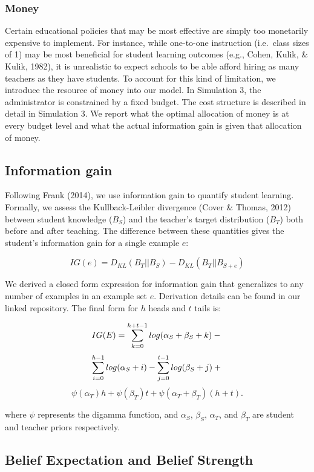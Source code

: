 \documentclass[10pt, letterpaper]{apa6}
\begin{document}
\subsubsection{Money}\label{money}

Certain educational policies that may be most effective are simply too
monetarily expensive to implement. For instance, while one-to-one
instruction (i.e.~class sizes of 1) may be most beneficial for student
learning outcomes (e.g., Cohen, Kulik, \& Kulik, 1982), it is
unrealistic to expect schools to be able afford hiring as many teachers
as they have students. To account for this kind of limitation, we
introduce the resource of money into our model. In Simulation 3, the
administrator is constrained by a fixed budget. The cost structure is
described in detail in Simulation 3. We report what the optimal
allocation of money is at every budget level and what the actual
information gain is given that allocation of money.

\subsection{Information gain}\label{information-gain}

Following Frank (2014), we use information gain to quantify student
learning. Formally, we assess the Kullback-Leibler divergence (Cover \&
Thomas, 2012) between student knowledge (\(B_S\)) and the teacher's
target distribution (\(B_T\)) both before and after teaching. The
difference between these quantities gives the student's information gain
for a single example \(e\):

\[IG(e) = D_{KL}(B_T ||B_S) - D_{KL}(B_T || B_{S+e})\]

We derived a closed form expression for information gain that
generalizes to any number of examples in an example set \(e\).
Derivation details can be found in our linked repository. The final form
for \(h\) heads and \(t\) tails is:

\[IG(E) = \sum_{k=0}^{h+t-1} {log(\alpha_S + \beta_S + k)} - \\\]
\[\sum_{i=0}^{h-1} {log (\alpha_S + i)} - \sum_{j=0}^{t-1} {log(\beta_S +j)} + \\\]
\[\psi(\alpha_T)h + \psi(\beta_T)t +  \psi(\alpha_T + \beta_T)(h+t).\]

\noindent where \(\psi\) represents the digamma function, and
\(\alpha_S\), \(\beta_S\), \(\alpha_T\), and \(\beta_T\) are student and
teacher priors respectively.

\subsection{Belief Expectation and Belief
Strength}\label{belief-expectation-and-belief-strength}
\end{document}
